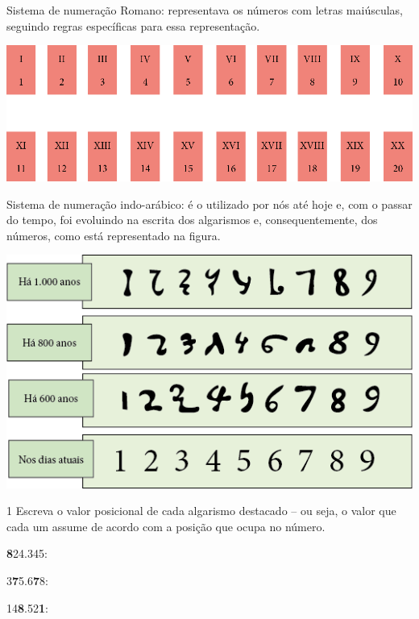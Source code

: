 {Sistema de numeração Romano: representava os números com letras
maiúsculas, seguindo regras específicas para essa representação.\bigskip

\includegraphics[width=\textwidth]{media/image4.png}\bigskip

Sistema de numeração indo-arábico: é o utilizado por nós
até hoje e, com o passar do tempo, foi evoluindo na escrita dos algarismos e, consequentemente, dos números, como está representado na figura.\smallskip

\includegraphics[width=.8\textwidth]{media/image5.png}
}


\num{1} Escreva o valor posicional de cada algarismo
destacado -- ou seja, o valor que cada um assume de acordo com a posição
que ocupa no número.

\begin{escolha}
\item \textbf{8}24.345: 

\item 3\textbf{7}5.6\textbf{7}8: 

\item 14\textbf{8}.52\textbf{1}:
\end{escolha}

